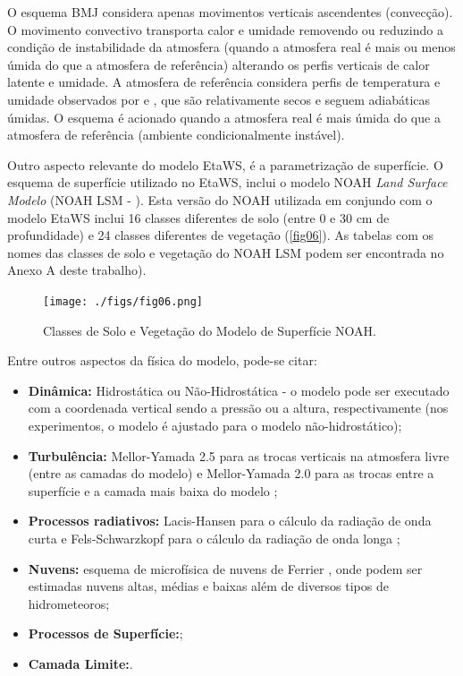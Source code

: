 O esquema BMJ considera apenas movimentos verticais ascendentes (convecção). O movimento convectivo transporta calor e umidade removendo ou reduzindo a condição de instabilidade da atmosfera (quando a atmosfera real é mais ou menos úmida do que a atmosfera de referência) alterando os perfis verticais de calor latente e umidade. A atmosfera de referência considera perfis de temperatura e umidade observados por \cite{betts86} e \cite{bettsmiller86}, que são relativamente secos e seguem adiabáticas úmidas. O esquema é acionado quando a atmosfera real é mais úmida do que a atmosfera de referência (ambiente condicionalmente instável).

Outro aspecto relevante do modelo EtaWS, é a parametrização de superfície. O esquema de superfície utilizado no EtaWS, inclui o modelo NOAH \textit{Land Surface Modelo} (NOAH LSM - \cite{mitchell01}). Esta versão do NOAH utilizada em conjundo com o modelo EtaWS inclui 16 classes diferentes de solo (entre 0 e 30 cm de profundidade) e 24 classes diferentes de vegetação (\autoref{fig06}). As tabelas com os nomes das classes de solo e vegetação do NOAH LSM podem ser encontrada no Anexo A deste trabalho).

\begin{figure}[!hbp]
\centering
\texttt{[image: ./figs/fig06.png]}
\caption{Classes de Solo e Vegetação do Modelo de Superfície NOAH.}
\label{fig06}
\end{figure}

Entre outros aspectos da física do modelo, pode-se citar:

\begin{itemize}
\item \textbf{Dinâmica:} Hidrostática ou Não-Hidrostática - o modelo pode ser executado com a coordenada vertical sendo a pressão ou a altura, respectivamente (nos experimentos, o modelo é ajustado para o modelo não-hidrostático);
\item \textbf{Turbulência:} Mellor-Yamada 2.5 para as trocas verticais na atmosfera livre (entre as camadas do modelo) e Mellor-Yamada 2.0 para as trocas entre a superfície e a camada mais baixa do modelo \cite{melloryamada74};
\item \textbf{Processos radiativos:} Lacis-Hansen para o cálculo da radiação de onda curta \cite{lacishansen74} e Fels-Schwarzkopf para o cálculo da radiação de onda longa \cite{felsschwarzkopf75};
\item \textbf{Nuvens:} esquema de microfísica de nuvens de Ferrier \cite{ferrieretal02}, onde podem ser estimadas nuvens altas, médias e baixas além de diversos tipos de hidrometeoros;
\item \textbf{Processos de Superfície:};
\item \textbf{Camada Limite:}.
\end{itemize}

